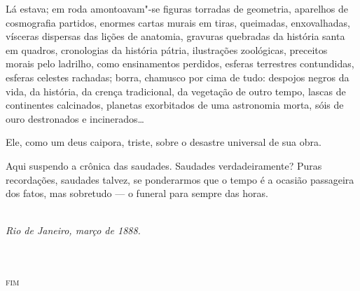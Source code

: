 Lá estava; em roda amontoavam"-se
figuras torradas de geometria, aparelhos de cosmografia partidos,
enormes cartas murais em tiras, queimadas, enxovalhadas, vísceras
dispersas das lições de anatomia, gravuras quebradas da história santa
em quadros, cronologias da história pátria, ilustrações zoológicas,
preceitos morais pelo ladrilho, como ensinamentos perdidos, esferas
terrestres contundidas, esferas celestes rachadas; borra, chamusco por
cima de tudo: despojos negros da vida, da história, da crença
tradicional, da vegetação de outro tempo, lascas de continentes
calcinados, planetas exorbitados de uma astronomia morta, sóis de ouro
destronados e incinerados\ldots{} 

Ele, como um deus caipora, triste, sobre o
desastre universal de sua obra. 

Aqui suspendo a crônica das saudades.
Saudades verdadeiramente? Puras recordações, saudades talvez, se
ponderarmos que o tempo é a ocasião passageira dos fatos, mas sobretudo 
--- o funeral para sempre das horas.

\ \\

\textit{Rio de Janeiro, março de 1888.}\\
\  \\
\ \\
\begin{center}\textsc{fim}\end{center}
